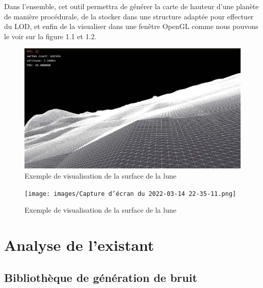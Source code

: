 \documentclass[12pt]{report}
\begin{document}
Dans l'ensemble, cet outil permettra de générer la carte de hauteur d'une planète de manière procédurale, de la stocker dans une structure adaptée pour effectuer du LOD, et enfin de la visualiser dans une fenêtre OpenGL comme nous pouvons le voir sur la figure 1.1 et 1.2. 


\vspace{0.3cm}

 \begin{figure}[h]
\centering
\begin{center}
\includegraphics[scale = 0.4]{images/Capture d’écran du 2022-03-05 15-46-04.png}
\caption{Exemple de visualisation de la surface de la lune}
\end{center}
\end{figure}

\begin{figure} [ht]
  \centering
  \begin{center}
  \texttt{[image: images/Capture d’écran du 2022-03-14 22-35-11.png]}
  \caption{Exemple de visualisation de la surface de la lune}
  \label{fig:gliederung}
  \end{center}
\end{figure}

\newpage

\chapter{Analyse de l'existant}

\section{Bibliothèque de génération de bruit}
\end{document}
